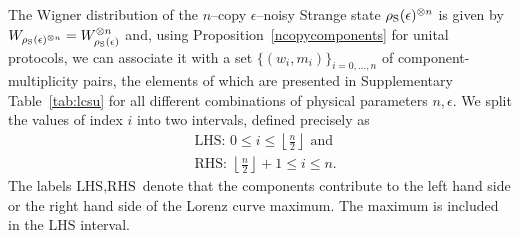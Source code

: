 \documentclass[
twocolumn,
superscriptaddress
]{revtex4-1}
\begin{document}
The Wigner distribution of the $n$--copy $\epsilon$--noisy Strange state $\rho_{\rm{S}}(\epsilon)^{\otimes n}$ is given by $W_{\rho_{\rm{S}}(\epsilon)^{\otimes n}} = W_{\rho_{\rm{S}}(\epsilon)}^{\otimes n}$ and, using Proposition~\ref{ncopycomponents} for unital protocols, we can associate it with a set $\{(w_i, m_i)\}_{i=0,\dots,n}$ of component-multiplicity pairs, the elements of which are presented in Supplementary Table~\ref{tab:lcsu} for all different combinations of physical parameters $n, \epsilon$.
We split the values of index $i$ into two intervals, defined precisely as
\begin{align}
&\text{LHS: } 0 \leq i \leq \left\lfloor \frac{n}{2} \right\rfloor \text{ and} \\
&\text{RHS: } \left\lfloor \frac{n}{2} \right\rfloor +1 \leq i \leq n.
\end{align}
The labels $\text{LHS}, \text{RHS}$ denote that the components contribute to the left hand side or the right hand side of the Lorenz curve maximum.
The maximum is included in the $\text{LHS}$ interval.
\end{document}
